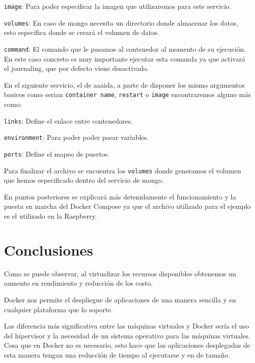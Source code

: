 \texttt{image}: Para poder especificar la imagen que utilizaremos para este servicio.

\texttt{volumes}: En caso de mongo necesita un directorio donde almacenar los datos, esto específica donde se creará el volumen de datos.

\texttt{command}:  El comando que le pasamos al contenedor al momento de su ejecución. En este caso concreto es muy importante ejecutar esta comanda ya que activará el journaling, que por defecto viene desactivado.

En el siguiente servicio, el de aaaida, a parte de disponer los mismo argumentos basicos como serian \texttt{container name}, \texttt{restart} o \texttt{image} encontraremos alguno más como:

\texttt{links}: Define el enlace entre contenedores.

\texttt{environment}: Para poder poder pasar variables.

\texttt{ports}: Define el mapeo de puertos.

Para finalizar el archivo se encuentra los \texttt{volumes} donde generamos el volumen que hemos especificado dentro del servicio de mongo.  

En puntos posteriores se explicará más detenidamente el funcionamiento y la puesta en marcha del Docker Compose ya que el archivo utilizado para el ejemplo es el utilizado en la Raspberry.

\section{Conclusiones}

Como se puede observar, al virtualizar los recursos disponibles obtenemos un aumento en rendimiento y reducción de los costo. 

Docker nos permite el despliegue de aplicaciones de una manera sencilla y en cualquier plataforma que lo soporte. 

Las diferencia más significativa entre las máquinas virtuales y Docker sería el uso del hipervisor y la necesidad de un sistema operativo para las máquinas virtuales. Cosa que en Docker no es necesario, esto hace que las aplicaciones desplegadas de esta manera tengan una reducción de tiempo al ejecutarse y en de tamaño.  
